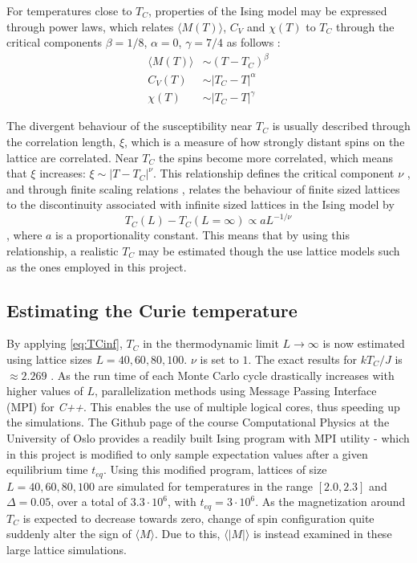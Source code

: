 \documentclass[%
oneside,                 %
final,                   %
10pt]{article}
\begin{document}
For temperatures close to $T_C$, properties of the Ising model may be expressed through power laws, which relates $\langle M(T) \rangle$, $C_V$ and $\chi (T)$ to $T_C$ through the critical components $\beta =1/8$, $\alpha=0$, $\gamma=7/4$ as follows \cite{assignmentpaper}:
\begin{align*}
\langle M (T) \rangle &\sim (T-T_C)^{\beta} \\
C_V (T) &\sim |T_C-T|^{\alpha} \\
\chi(T) &\sim |T_C-T|^{\gamma}
\end{align*}

The divergent behaviour of the susceptibility near $T_C$ is usually described through the correlation length, $\xi$, which is a measure of how strongly distant  spins on the lattice are correlated.  Near $T_C$ the spins become more correlated, which means that $\xi$ increases: $ \xi \sim |T-T_C|^{\nu}$. This relationship defines the critical component $\nu$ \cite{HJ-SP}, and through  finite scaling relations \cite{assignmentpaper}, relates the behaviour of finite sized lattices to the discontinuity associated with infinite sized lattices in the Ising model by 
\begin{equation}
T_C(L)-T_C(L=\infty) \propto a L^{-1/\nu}
\label{eq:TCinf}
\end{equation}
, where $a$ is a proportionality constant. This means that by using this relationship, a realistic $T_C$ may be estimated though the use lattice models such as the ones employed in this project. \newline

\subsection{Estimating the Curie temperature}
\label{SS.Est.Curie}
By applying \eqref{eq:TCinf}, $T_C$ in the thermodynamic limit $L \rightarrow \infty$ is now estimated using lattice sizes $L=40, 60, 80,100$. $\nu$ is set to $1$. The exact results for $kT_C/J$ is $\approx 2.269$ \cite{assignmentpaper}.  As the run time of each Monte Carlo cycle drastically increases with higher values of $L$, parallelization methods using Message Passing Interface (MPI) for \textit{C++}. This enables the use of multiple logical cores, thus speeding up the simulations.  The Github page of the course Computational Physics at the University of Oslo \cite{CPgithub} provides a readily built Ising program with MPI utility - which in this project is modified to only sample expectation values after a given equilibrium time $t_{eq}$. Using this modified program, lattices of size $L=40, 60, 80, 100$ are simulated for temperatures in the range $[2.0,2.3]$ and $\Delta=0.05$, over a total of $3.3 \cdot 10^6$, with $t_{eq}=3 \cdot 10^6$. As the magnetization around $T_C$ is expected to decrease towards zero, change of spin configuration quite suddenly alter the sign of $\langle M \rangle$. Due to this, $\langle |M| \rangle$ is instead examined in these large lattice simulations. \newline
\end{document}

